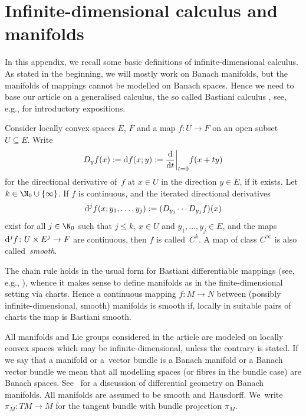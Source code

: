 \section{Infinite-dimensional calculus and manifolds}\label{App:Bast}

In this appendix, we recall some basic definitions of infinite-dimensional calculus.
As stated in the beginning, we will mostly work on Banach manifolds, but the manifolds of mappings cannot be modelled on Banach spaces. Hence we need to base our article on a generalised calculus, the so called Bastiani calculus \cite{Bas64}, see, e.g., \cite{GaS22, Sch23} for introductory expositions.

\begin{Definition}%
Consider locally convex spaces $E$, $F$
and a map $f\colon U\rightarrow F$ on an open subset $U\subseteq E$.
Write
\[
D_yf(x):= {\rm d}f(x;y):= \frac{{\rm d}}{{\rm d}t}\biggr|_{t=0}f(x+ty)
\]
for the directional derivative of~$f$ at $x\in U$
in the direction $y\in E$, if it exists.
Let $k\in \N_0\cup\{\infty\}$.
If $f$ is continuous, and the iterated directional derivatives
\[
{\rm d}^jf(x;y_1,\dots, y_j):= (D_{y_j}\cdots D_{y_1}f)(x)
\]
exist for all $j\in\N_0$ such that
$j\leq k$, $x\in U$ and $y_1,\dots, y_j\in E$,
and the maps ${\rm d}^jf\colon U\times E^j\to F$
are continuous, then $f$ is called~$C^k$.
A map of class $C^\infty$ is also called~\emph{smooth}.
\end{Definition}

The chain rule holds in the usual form for Bastiani differentiable mappings (see, e.g., \cite[Proposition~1.23]{Sch23}), whence it makes sense to define manifolds as in the finite-dimensional setting via charts. Hence a continuous mapping $f \colon M \rightarrow N$ between (possibly infinite-dimensional, smooth) manifolds is smooth if, locally in suitable pairs of charts the map is Bastiani smooth.

All manifolds and Lie groups considered
in the article are modeled on locally
convex spaces which may be infinite-dimensional,
unless the contrary is stated. If we say that a manifold or a~vector bundle is a Banach manifold or a Banach vector bundle we mean that all modelling spaces (or fibres in the bundle case) are Banach spaces. See~\cite{La01} for a discussion of differential geometry on Banach manifolds. All manifolds are assumed to be smooth and Hausdorff.
We~write~$\pi_M \colon TM \rightarrow M$ for the tangent bundle with bundle projection $\pi_M$.

